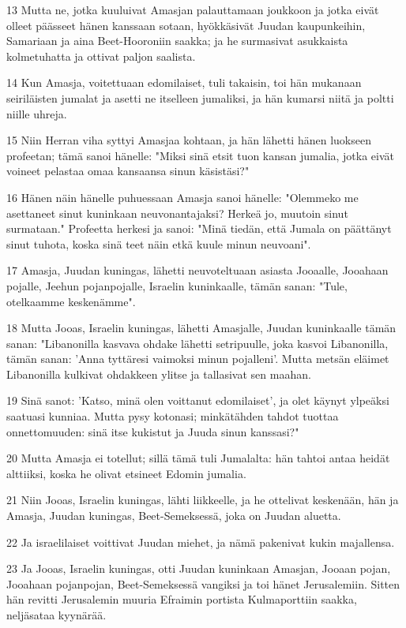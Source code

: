 \par 13 Mutta ne, jotka kuuluivat Amasjan palauttamaan joukkoon ja jotka eivät olleet päässeet hänen kanssaan sotaan, hyökkäsivät Juudan kaupunkeihin, Samariaan ja aina Beet-Hooroniin saakka; ja he surmasivat asukkaista kolmetuhatta ja ottivat paljon saalista.
\par 14 Kun Amasja, voitettuaan edomilaiset, tuli takaisin, toi hän mukanaan seiriläisten jumalat ja asetti ne itselleen jumaliksi, ja hän kumarsi niitä ja poltti niille uhreja.
\par 15 Niin Herran viha syttyi Amasjaa kohtaan, ja hän lähetti hänen luokseen profeetan; tämä sanoi hänelle: "Miksi sinä etsit tuon kansan jumalia, jotka eivät voineet pelastaa omaa kansaansa sinun käsistäsi?"
\par 16 Hänen näin hänelle puhuessaan Amasja sanoi hänelle: "Olemmeko me asettaneet sinut kuninkaan neuvonantajaksi? Herkeä jo, muutoin sinut surmataan." Profeetta herkesi ja sanoi: "Minä tiedän, että Jumala on päättänyt sinut tuhota, koska sinä teet näin etkä kuule minun neuvoani".
\par 17 Amasja, Juudan kuningas, lähetti neuvoteltuaan asiasta Jooaalle, Jooahaan pojalle, Jeehun pojanpojalle, Israelin kuninkaalle, tämän sanan: "Tule, otelkaamme keskenämme".
\par 18 Mutta Jooas, Israelin kuningas, lähetti Amasjalle, Juudan kuninkaalle tämän sanan: "Libanonilla kasvava ohdake lähetti setripuulle, joka kasvoi Libanonilla, tämän sanan: 'Anna tyttäresi vaimoksi minun pojalleni'. Mutta metsän eläimet Libanonilla kulkivat ohdakkeen ylitse ja tallasivat sen maahan.
\par 19 Sinä sanot: 'Katso, minä olen voittanut edomilaiset', ja olet käynyt ylpeäksi saatuasi kunniaa. Mutta pysy kotonasi; minkätähden tahdot tuottaa onnettomuuden: sinä itse kukistut ja Juuda sinun kanssasi?"
\par 20 Mutta Amasja ei totellut; sillä tämä tuli Jumalalta: hän tahtoi antaa heidät alttiiksi, koska he olivat etsineet Edomin jumalia.
\par 21 Niin Jooas, Israelin kuningas, lähti liikkeelle, ja he ottelivat keskenään, hän ja Amasja, Juudan kuningas, Beet-Semeksessä, joka on Juudan aluetta.
\par 22 Ja israelilaiset voittivat Juudan miehet, ja nämä pakenivat kukin majallensa.
\par 23 Ja Jooas, Israelin kuningas, otti Juudan kuninkaan Amasjan, Jooaan pojan, Jooahaan pojanpojan, Beet-Semeksessä vangiksi ja toi hänet Jerusalemiin. Sitten hän revitti Jerusalemin muuria Efraimin portista Kulmaporttiin saakka, neljäsataa kyynärää.
